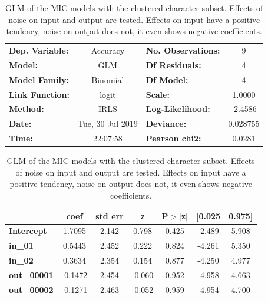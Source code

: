 \documentclass{article}
\begin{document}
\begin{table}[!htb]
	\centering
	\caption{GLM of the MIC models with the clustered character subset. Effects of noise on input and output are tested. Effects on input have a positive tendency, noise on output does not, it even shows negative coefficients.}
	\begin{tabular}{lclc}
		\toprule
		\textbf{Dep. Variable:} &     Accuracy     & \textbf{  No. Observations:  } &        9    \\
		\textbf{Model:}         &       GLM        & \textbf{  Df Residuals:      } &        4    \\
		\textbf{Model Family:}  &     Binomial     & \textbf{  Df Model:          } &        4    \\
		\textbf{Link Function:} &      logit       & \textbf{  Scale:             } &    1.0000   \\
		\textbf{Method:}        &       IRLS       & \textbf{  Log-Likelihood:    } &   -2.4586   \\
		\textbf{Date:}          & Tue, 30 Jul 2019 & \textbf{  Deviance:          } &  0.028755   \\
		\textbf{Time:}          &     22:07:58     & \textbf{  Pearson chi2:      } &   0.0281    \\
		\bottomrule
	\end{tabular}
	\begin{tabular}{lcccccc}
		& \textbf{coef} & \textbf{std err} & \textbf{z} & \textbf{P$>$$|$z$|$} & \textbf{[0.025} & \textbf{0.975]}  \\
		\midrule
		\textbf{Intercept}  &       1.7095  &        2.142     &     0.798  &         0.425        &       -2.489    &        5.908     \\
		\textbf{in\_01}     &       0.5443  &        2.452     &     0.222  &         0.824        &       -4.261    &        5.350     \\
		\textbf{in\_02}     &       0.3634  &        2.354     &     0.154  &         0.877        &       -4.250    &        4.977     \\
		\textbf{out\_00001} &      -0.1472  &        2.454     &    -0.060  &         0.952        &       -4.958    &        4.663     \\
		\textbf{out\_00002} &      -0.1271  &        2.463     &    -0.052  &         0.959        &       -4.954    &        4.700     \\
		\bottomrule
	\end{tabular}
	\label{table:Chars_dtw_GLM}
\end{table}
\end{document}
